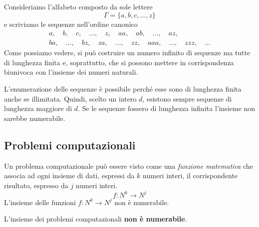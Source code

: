 \begin{example}
	Consideriamo l'alfabeto composto da sole lettere
	\[ \Gamma = \{ a, b, c, \dots, z \} \]
	e scriviamo le sequenze nell'ordine canonico
	\begin{gather*}
		a, \quad b, \quad c, \quad \dots, \quad z, \quad aa, \quad ab, \quad \dots, \quad az, \\
		ba, \quad \dots, \quad bz, \quad za, \quad \dots, \quad zz, \quad aaa, \quad \dots, \quad zzz, \quad \dots
	\end{gather*}
	Come possiamo vedere, si pu\`o costruire un numero infinito di sequenze ma tutte di lunghezza finita e, soprattutto,
	che si possono mettere in corrispondenza biunivoca con l'insieme dei numeri naturali.
\end{example}

\begin{observation}
	L'enumerazione delle sequenze \`e possibile perch\'e esse sono di lunghezza finita anche se illimitata. Quindi,
	scelto un intero $d$, esistono sempre sequenze di lunghezza maggiore di $d$. Se le sequenze fossero di lunghezza
	infinita l'insieme non sarebbe numerabile.
\end{observation}


\subsection{Problemi computazionali}
Un problema computazionale pu\`o essere visto come una \emph{funzione matematica} che associa ad ogni insieme di dati,
espressi da $k$ numeri interi, il corrispondente risultato, espresso da $j$ numeri interi.
\[ f : N^k \rightarrow N^j \]
L'insieme delle funzioni $f : N^k \rightarrow N^j$ non \`e numerabile.

\begin{theorem}\label{th: non_num}
	L'insieme dei problemi computazionali \textbf{non \`e numerabile}.
\end{theorem}

